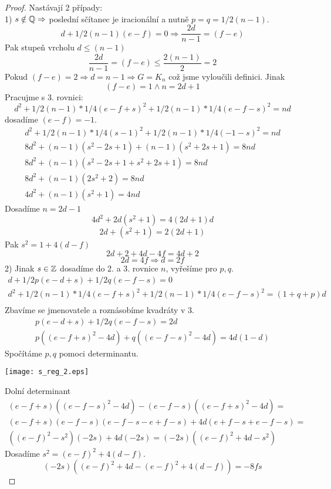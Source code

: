 \begin{proof}
	Nastávají 2 případy:\\
	1) $s \notin \operatorname{\mathbb{Q}} \Rightarrow$ poslední sčítanec je iracionální a nutně $ p = q = 1/2 (n - 1)$.
	\[ d + 1/2 (n-1) (e - f) = 0 \Rightarrow \frac{2d}{n - 1} = (f - e) \]
	Pak stupeň vrcholu $ d \leq (n - 1)$
	\[ \frac{2d}{n - 1} = (f - e) \leq \frac{2 (n-1)}{2} = 2 \]
	Pokud $(f - e) = 2 \Rightarrow d = n-1 \Rightarrow G = K_n$ což jsme vyloučili definici. Jinak
	\[(f - e) = 1 \land n = 2d + 1 \]
	Pracujme s 3. rovnici:
	\[ d^2 + 1/2 (n-1) * 1/4 (e - f + s)^2 + 1/2 (n-1) * 1/4 (e - f -s)^2 = nd \]
	dosadíme $(e - f) = -1$.
	\begin{equation*}
	\begin{aligned}
	 d^2 + 1/2 (n-1) * 1/4 (s - 1)^2 + 1/2 (n-1) * 1/4 (-1 - s)^2 = nd \\
	 8d^2 + (n-1)(s^2 - 2s + 1) + (n-1)(s^2 + 2s + 1) = 8nd \\
	 8d^2 + (n-1)(s^2 - 2s + 1 + s^2 + 2s + 1) = 8nd \\
	 8d^2 + (n-1)(2s^2 + 2) = 8nd \\
	 4d^2 + (n-1)(s^2 + 1) = 4nd
	\end{aligned}
	\end{equation*}
	Dosadíme $n = 2d - 1$
	\[ 4d^2 + 2d(s^2 + 1) = 4(2d + 1)d \]
	\[ 2d + (s^2 + 1) = 2(2d + 1) \]
	Pak $s^2 = 1 + 4(d - f)$
	\[ 2d + 2 + 4d - 4f = 4d + 2 \]
	\[ 2d = 4f \Rightarrow d = 2f \]
	2) Jinak $s \in \operatorname{\mathbb{Z}}$ dosadíme do 2. a 3. rovnice $n$, vyřešíme pro $p,q$.
	\begin{equation*}
	\begin{aligned}
		d + 1/2 p (e - d + s) + 1/2 q (e - f - s) = 0 \\
		d^2 + 1/2 (n-1) * 1/4 (e - f + s)^2 + 1/2 (n-1) * 1/4 (e - f -s)^2 = (1 + q + p)d \\
	\end{aligned}
	\end{equation*}
	Zbavíme se jmenovatele a roznásobíme kvadráty v 3.
	\begin{equation*}
	\begin{aligned}
		p (e - d + s) + 1/2 q (e - f - s) = 2d \\
		p((e - f + s)^2 - 4d) + q((e - f -s)^2 - 4d) = 4d (1 - d)
	\end{aligned}
	\end{equation*}
	Spočítáme $p,q$ pomoci determinantu.

	\texttt{[image: s\_reg\_2.eps]}

	Dolní determinant
	\begin{equation*}
	\begin{split}
		(e - f + s)((e - f - s)^2 -4d) - (e - f - s)((e - f + s)^2 - 4d) = \\
		(e - f + s)(e - f - s)(e - f -s - e + f - s) + 4d (e + f - s + e - f - s) = \\
		((e - f)^2 - s^2)(-2s) + 4d (-2s) = (-2s)((e - f)^2 + 4d - s^2)
	\end{split}
	\end{equation*}
	Dosadíme $s^2 = (e - f)^2 + 4(d - f)$.
	\[ (-2s)((e - f)^2 + 4d - (e - f)^2 + 4(d - f)) = -8fs \]


\end{proof}
